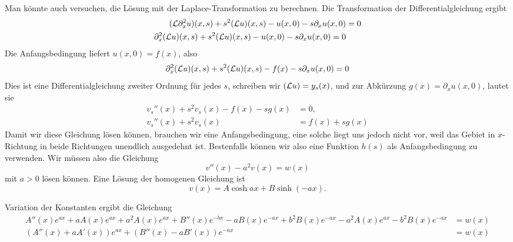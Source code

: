 \begin{loesung}
Man könnte auch versuchen, die Lösung mit der Laplace-Transformation
zu berechnen. Die Transformation der Differentialgleichung ergibt
\begin{align*}
({\cal L}\partial_x^2u)(x,s)
+
s^2({\cal L}u)(x, s)-u(x,0)-s\partial_xu(x,0)
&=0\\
\partial_x^2({\cal L}u)(x,s)+s^2({\cal L}u)(x, s)-u(x,0)-s\partial_xu(x,0)=0
\end{align*}
Die Anfangsbedingung liefert $u(x,0)=f(x)$, also
\[
\partial_x^2({\cal L}u)(x,s)+s^2({\cal L}u)(x, s)-f(x)-s\partial_xu(x,0)=0
\]
Dies ist eine Differentialgleichung zweiter Ordnung für jedes $s$, schreiben
wir $({\cal L}u)=y_s(x)$, und zur Abkürzung $g(x)=\partial_xu(x,0)$,
lautet sie
\begin{align*}
v_s''(x)+s^2v_s(x)-f(x)-sg(x)&=0,\\
v_s''(x)+s^2v_s(x)&=f(x)+sg(x)
\end{align*}
Damit wir diese Gleichung lösen können, brauchen wir eine
Anfangsbedingung, eine solche liegt uns jedoch nicht vor, weil
das Gebiet in $x$-Richtung in beide Richtungen unendlich ausgedehnt
ist.
Bestenfalls können wir also eine Funktion $h(s)$ als Anfangsbedingung
zu verwenden. Wir müssen also die Gleichung
\[
v''(x)-a^2v(x)=w(x)
\]
mit $a>0$
lösen können. Eine Lösung der homogenen Gleichung ist
\[
v(x)=A\cosh ax+B\sinh(-ax).
\]

Variation der Konstanten ergibt die Gleichung
\begin{align*}
A''(x)e^{ax}+aA(x)e^{ax}+a^2A(x)e^{ax}
+
B''(x)e^{-bx}-aB(x)e^{-ax}+b^2B(x)e^{-ax}
-a^2A(x)e^{ax}-b^2B(x)e^{-ax}&=w(x)
\\
(A''(x)+aA'(x))e^{ax}
+
(B''(x)-aB'(x))e^{-ax}
&=w(x)
\end{align*}
\end{loesung}
